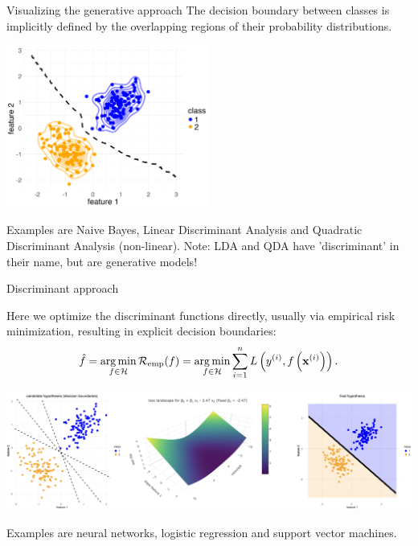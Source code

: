 \documentclass[11pt,compress,t,notes=noshow, xcolor=table]{beamer}
\begin{document}
\begin{vbframe}{Visualizing the generative approach}
The decision boundary between classes is implicitly defined by the overlapping regions of their probability distributions.

\begin{center}
\includegraphics[width=0.5\textwidth]{figure/approach_generative.png} 
\end{center}

\small{
Examples are Naive Bayes, Linear Discriminant Analysis and Quadratic Discriminant Analysis (non-linear). Note: LDA and QDA have 'discriminant' in their name, but are generative models!}
\end{vbframe}

\begin{vbframe}{Discriminant approach}

Here we optimize the discriminant functions directly, usually via empirical risk minimization, resulting in explicit decision boundaries:
$$ \hat{f} = \operatorname*{arg\,min}_{f \in \mathcal{H}} \mathcal{R}_{\text{emp}}(f) = \operatorname*{arg\,min}_{f \in \mathcal{H}} \sum\limits_{i=1}^n L\left(y^{(i)}, f\left(\mathbf{x}^{(i)}\right)\right).$$

\begin{center}
\includegraphics[width=1.1\textwidth]{figure_man/disc_approach.png} 
\end{center}

\small{
Examples are neural networks, logistic regression and support vector machines.
}

\end{vbframe}

\endlecture
\end{document}
